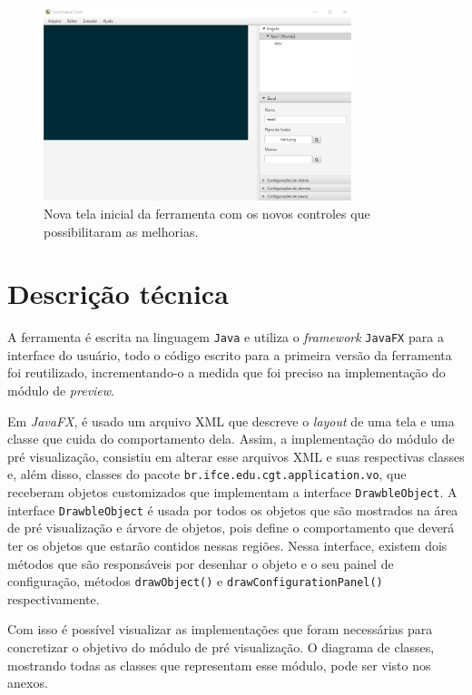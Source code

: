 \documentclass[12pt,oneside,openright,a4paper,english,brazil,sumario=tradicional]{abntex2}
\begin{document}
\begin{figure}[h]
   \centering
   \includegraphics[width=0.8\textwidth]{images/tela_inicial_2.jpg}
   \caption{Nova tela inicial da ferramenta com os novos controles que possibilitaram as melhorias.}
   \label{fig:tela_inicial_2}
\end{figure}

\section{Descrição técnica}

A ferramenta é escrita na linguagem \texttt{Java} e utiliza o \emph{framework} \texttt{JavaFX} para a interface do usuário, todo o código escrito para a primeira versão da ferramenta foi reutilizado, incrementando-o a medida que foi preciso na implementação do módulo de \textit{preview}.

Em \emph{JavaFX}, é usado um arquivo XML que descreve o \emph{layout} de uma tela e uma classe que cuida do comportamento dela. Assim, a implementação do módulo de pré visualização, consistiu em alterar esse arquivos XML e suas respectivas classes e, além disso, classes do pacote \texttt{br.ifce.edu.cgt.application.vo}, que receberam objetos customizados que implementam a interface \texttt{DrawbleObject}. A interface \texttt{DrawbleObject} é usada por todos os objetos que são mostrados na área de pré visualização e árvore de objetos, pois define o comportamento que deverá ter os objetos que estarão contidos nessas regiões. Nessa interface, existem dois métodos que são responsáveis por desenhar o objeto e o seu painel de configuração, métodos \texttt{drawObject()} e \texttt{drawConfigurationPanel()} respectivamente.

Com isso é possível visualizar as implementações que foram necessárias para concretizar o objetivo do módulo de pré visualização. O diagrama de classes, mostrando todas as classes que representam esse módulo, pode ser visto nos anexos.
\end{document}

